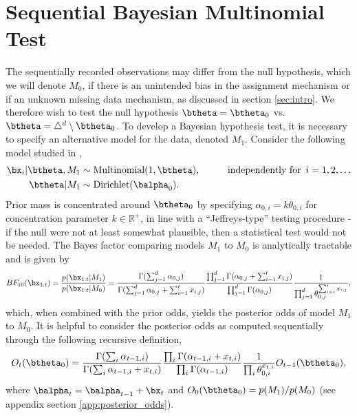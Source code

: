 \documentclass[11pt]{article}
\begin{document}
\section{Sequential Bayesian Multinomial Test}
\label{sec:srm_testing}
The sequentially recorded observations may differ from the null hypothesis, which we will denote $M_0$, if there is an unintended bias in the assignment mechanism or if an unknown missing data mechanism, as discussed in section \ref{sec:intro}.
We therefore wish to test the null hypothesis $\btheta = \btheta_0$ vs.\ $\btheta = \triangle^d \setminus \btheta_0$.
To develop a Bayesian hypothesis test, it is necessary to specify an alternative model for the data, denoted $M_1$.
Consider the following model studied in \cite{good},
\begin{align}
    \bx_i | \btheta, M_1 &\sim \text{Multinomial}(1,\btheta), \hspace{1cm} \text{independently for }\, i=1,2,\dots\\
  \btheta | M_1 &\sim \text{Dirichlet}(\balpha_0).\notag
\end{align}
Prior mass is concentrated around $\btheta_0$ by specifying $\alpha_{0,i} = k \theta_{0,i}$ for concentration parameter $k \in \mathbb{R}^+$, in line with a ``Jeffreys-type'' testing procedure - if the null were not at least somewhat plausible, then a statistical test would not be needed.
The Bayes factor comparing models $M_1$ to $M_0$ is analytically tractable and is given by
\begin{equation}
  \label{eq:bayes_factor}
 BF_{10}(\bx_{1:t}) = \frac{p(\bx_{1:t}|M_1)}{p(\bx_{1:t}|M_0)} = \frac{\Gamma(\sum_{j=1}^{d} \alpha_{0,j})}{\Gamma(\sum_{j=1}^{d} \alpha_{0,j} + \sum_{i=1}^{t}x_{i,j})}\frac{\prod_{j=1}^{d}\Gamma(\alpha_{0,j} + \sum_{i=1}^{t}x_{i,j} )}{\prod_{j=1}^{d}\Gamma(\alpha_{0,j} )}\frac{1}{\prod_{j=1}^{d} \theta_{0,j}^{\sum_{i=1}^{t}x_{i,j}}},
\end{equation}
which, when combined with the prior odds, yields the posterior odds of model $M_1$ to $M_0$.
It is helpful to consider the posterior odds as computed sequentially through the following recursive definition,
\begin{equation}
  \label{eq:update_rule}
  O_{t}(\btheta_0) = \frac{\Gamma(\sum_i \alpha_{t-1,i})}{\Gamma(\sum_i \alpha_{t-1,i} +  x_{t,i})} \frac{\prod_i \Gamma(\alpha_{t-1,i} + x_{t,i})}{\prod_i \Gamma(\alpha_{t-1,i})} \frac{1}{\prod_i \theta_{0,i}^{x_{t,i}}}  O_{t-1}(\btheta_0),
\end{equation}
where $\balpha_t = \balpha_{t-1}+\bx_t$ and $O_0(\btheta_0)=p(M_1)/p(M_0)$ (see appendix section \ref{app:posterior_odds}).
\end{document}
